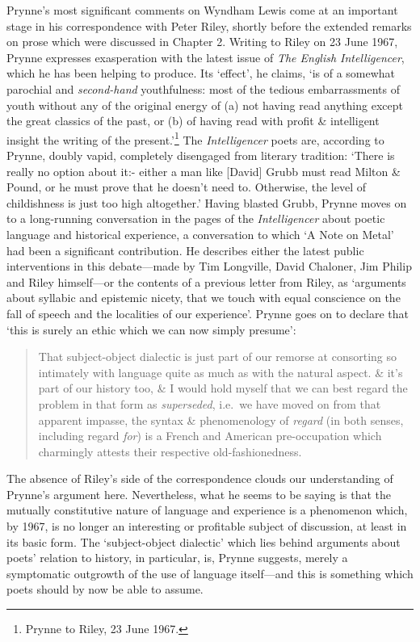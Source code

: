 \documentclass[]{article}
\begin{document}
Prynne’s most significant comments on Wyndham Lewis come at an important
stage in his correspondence with Peter Riley, shortly before the
extended remarks on prose which were discussed in Chapter 2. Writing to
Riley on 23 June 1967, Prynne expresses exasperation with the latest
issue of \emph{The English Intelligencer}, which he has been helping to
produce. Its ‘effect’, he claims, ‘is of a somewhat parochial and
\emph{second-hand} youthfulness: most of the tedious embarrassments of
youth without any of the original energy of (a) not having read anything
except the great classics of the past, or (b) of having read with profit
\& intelligent insight the writing of the present.’\footnote{Prynne to
  Riley, 23 June 1967.} The \emph{Intelligencer} poets are, according to
Prynne, doubly vapid, completely disengaged from literary tradition:
‘There is really no option about it:- either a man like {[}David{]}
Grubb must read Milton \& Pound, or he must prove that he doesn’t need
to. Otherwise, the level of childishness is just too high altogether.’
Having blasted Grubb, Prynne moves on to a long-running conversation in
the pages of the \emph{Intelligencer} about poetic language and
historical experience, a conversation to which ‘A Note on Metal’ had
been a significant contribution. He describes either the latest public
interventions in this debate—made by Tim Longville, David Chaloner, Jim
Philip and Riley himself—or the contents of a previous letter from
Riley, as ‘arguments about syllabic and epistemic nicety, that we touch
with equal conscience on the fall of speech and the localities of our
experience’. Prynne goes on to declare that ‘this is surely an ethic
which we can now simply presume’:

\begin{quote}
\singlespacing That subject-object dialectic is just part of our remorse
at consorting so intimately with language quite as much as with the
natural aspect. \& it’s part of our history too, \& I would hold myself
that we can best regard the problem in that form as \emph{superseded},
i.e.~we have moved on from that apparent impasse, the syntax \&
phenomenology of \emph{regard} (in both senses, including regard
\emph{for}) is a French and American pre-occupation which charmingly
attests their respective old-fashionedness.
\end{quote}

\noindent The absence of Riley’s side of the correspondence clouds our
understanding of Prynne’s argument here. Nevertheless, what he seems to
be saying is that the mutually constitutive nature of language and
experience is a phenomenon which, by 1967, is no longer an interesting
or profitable subject of discussion, at least in its basic form. The
‘subject-object dialectic’ which lies behind arguments about poets’
relation to history, in particular, is, Prynne suggests, merely a
symptomatic outgrowth of the use of language itself—and this is
something which poets should by now be able to assume.
\end{document}
